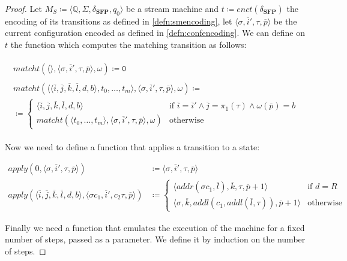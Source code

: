 \documentclass[10pt]{amsart}
\newcommand{\SFP}{\mathbf{SFP}}
\newcommand{\zero}{\mathtt{0}}
\newcommand{\QQ}{\mathbb{Q}}
\newcommand{\msi}[1]{q_{#1}}
\newcommand{\mci}[1]{c_{#1}}
\newcommand{\mti}[1]{t{_#1}}
\newcommand{\mcan}{M_{S}}
\newcommand{\genm}{\mcan\coloneqq \langle \QQ, \Sigma, \TT, \msi0 \rangle}
\newcommand{\sone}{\sigma}
\newcommand{\stwo}{\tau}
\newcommand{\TT}{\delta_\SFP}
\begin{document}
\begin{proof}

Let $\genm$ be a stream machine and $t\coloneqq enct(\TT)$ the encoding of its transitions as defined in \ref{defn:smencoding}, let $\langle \sone, \overline i', \stwo, \overline p\rangle$ be the current configuration encoded as defined in \ref{defn:confencoding}. We can define on $t$ the function which computes the matching transition as follows:

\begin{align*}
\begin{gathered}
matcht(\langle \rangle, \langle \sone, \overline i', \stwo, \overline p\rangle, \omega)\coloneqq  \zero\\\\
matcht(\langle \langle \overline i, \overline j, \overline k, \overline l, d, b\rangle, \mti 0, \ldots,\mti m \rangle, \langle \sone, \overline i', \stwo, \overline p\rangle, \omega)\coloneqq\\\coloneqq \begin{cases} \langle \overline i, \overline j, \overline k, \overline l, d, b\rangle & \text{if } \overline i = \overline i' \land \overline  j = \pi_1 (\stwo) \land \omega(\overline p)=b\\
matcht(\langle \mti 0, \ldots,\mti m \rangle,  \langle \sone, \overline i', \stwo, \overline p\rangle, \omega)& \text{otherwise}
\end{cases}
\end{gathered}
\end{align*}

Now we need to define a function that applies a transition to a state:

\begin{align*}
apply(0, \langle \sone, \overline i', \stwo, \overline p\rangle)&\coloneqq \langle \sone, \overline i', \stwo, \overline p\rangle\\
apply(\langle \overline i, \overline j, \overline k, \overline l, d, b\rangle, \langle \sone\mci 1, \overline i', \mci 2\stwo, \overline p\rangle)&\coloneqq\begin{cases} \langle addr(\sone\mci1, \overline l), \overline k, \stwo, \overline p+1\rangle & \text{if } d=R\\
\langle \sone, \overline k, addl(c_1, addl(\overline l,\stwo)), \overline p+1\rangle & \text{otherwise}
\end{cases}
\end{align*}

Finally we need a function that emulates the execution of the machine for a fixed number of steps, passed as a parameter. We define it by induction on the number of steps.


\end{proof}
\end{document}

